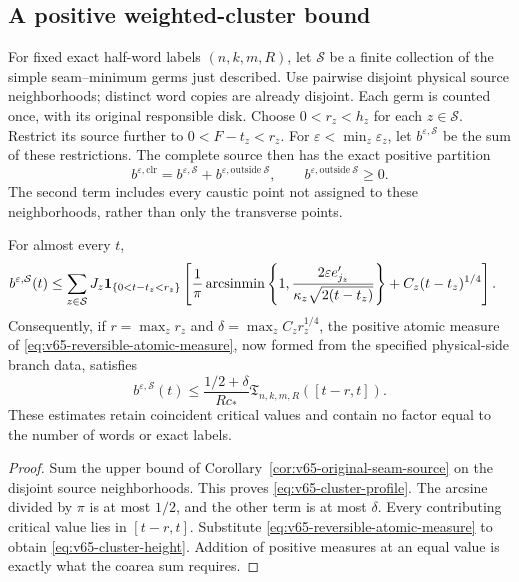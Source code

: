 \subsection{A positive weighted-cluster bound}
For fixed exact half-word labels $(n,k,m,R)$, let $\mathcal S$ be a
finite collection of the simple seam--minimum germs just described.
Use pairwise disjoint physical source neighborhoods; distinct word
copies are already disjoint. Each germ is counted once, with its
original responsible disk. Choose $0<r_z<h_z$ for each $z\in\mathcal S$.
Restrict its source further to $0<F-t_z<r_z$. For
$\varepsilon<\min_z\varepsilon_z$, let
$b^{\varepsilon,\mathcal S}$ be the sum of these restrictions.
The complete source then has the exact positive partition
\begin{equation}\label{eq:v65-positive-partition}
 b^{\varepsilon,\mathrm{clr}}
       =b^{\varepsilon,\mathcal S}
                         +b^{\varepsilon,\mathrm{outside}\ \mathcal S},
       \qquad b^{\varepsilon,\mathrm{outside}\ \mathcal S}\ge0.
\end{equation}
The second term includes every caustic point not assigned to these
neighborhoods, rather than only the transverse points.

\begin{theorem}
\label{thm:v65-cluster-height}
For almost every $t$,
\begin{align}\label{eq:v65-cluster-profile}
 b^{\varepsilon,\mathcal S}(t)
 &\le\sum_{z\in\mathcal S}J_z\one_{\{0<t-t_z<r_z\}}
 \left[\frac1\pi\arcsin\!\min\left\{1,
       \frac{2\varepsilon e'_{j_z}}{\kappa_z\sqrt{2(t-t_z)}}\right\}
                  +C_z(t-t_z)^{1/4}\right].
\end{align}
Consequently, if $r=\max_zr_z$ and
$\delta=\max_z C_zr_z^{1/4}$, the positive atomic measure of
\eqref{eq:v65-reversible-atomic-measure}, now formed from the specified
physical-side branch data, satisfies
\begin{equation}\label{eq:v65-cluster-height}
 b^{\varepsilon,\mathcal S}(t)
       \le\frac{1/2+\delta}{R c_*}
                           \mathfrak T_{n,k,m,R}([t-r,t]).
\end{equation}
These estimates retain coincident critical values and contain no
factor equal to the number of words or exact labels.
\end{theorem}
\begin{proof}
Sum the upper bound of Corollary~\ref{cor:v65-original-seam-source}
on the disjoint source neighborhoods. This proves
\eqref{eq:v65-cluster-profile}. The arcsine divided by $\pi$ is at
most $1/2$, and the other term is at most $\delta$. Every contributing
critical value lies in $[t-r,t]$. Substitute
\eqref{eq:v65-reversible-atomic-measure} to obtain
\eqref{eq:v65-cluster-height}. Addition of positive measures at an
equal value is exactly what the coarea sum requires.
\end{proof}


